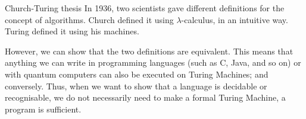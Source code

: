 \documentclass[a4paper]{article}
\begin{document}
\begin{parag}{Church-Turing thesis}
    In 1936, two scientists gave different definitions for the concept of algorithms. Church defined it using $\lambda$-calculus, in an intuitive way. Turing defined it using his machines.

    However, we can show that the two definitions are equivalent. This means that anything we can write in programming languages (such as C, Java, and so on) or with quantum computers can also be executed on Turing Machines; and conversely. Thus, when we want to show that a language is decidable or recognisable, we do not necessarily need to make a formal Turing Machine, a program is sufficient.
\end{parag}
\end{document}
